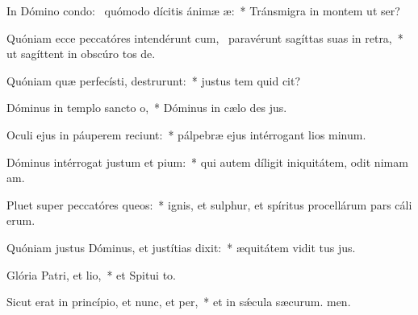 \item In Dómino condo:~\pscross{} quómodo dícitis ánimæ æ:~* Tránsmigra in montem ut ser?
\item Quóniam ecce peccatóres intendérunt cum,~\pscross{} paravérunt sagíttas suas in retra,~* ut sagíttent in obscúro tos de.
\item Quóniam quæ perfecísti, destrurunt:~* justus tem quid cit?
\item Dóminus in templo sancto o,~* Dóminus in cælo des jus.
\item Oculi ejus in páuperem reciunt:~* pálpebræ ejus intérrogant lios minum.
\item Dóminus intérrogat justum et pium:~* qui autem díligit iniquitátem, odit nimam am.
\item Pluet super peccatóres queos:~* ignis, et sulphur, et spíritus procellárum pars cáli erum.
\item Quóniam justus Dóminus, et justítias dixit:~* æquitátem vidit tus jus.
\item Glória Patri, et lio,~* et Spitui to.
\item Sicut erat in princípio, et nunc, et per,~* et in sǽcula sæcurum. men.
